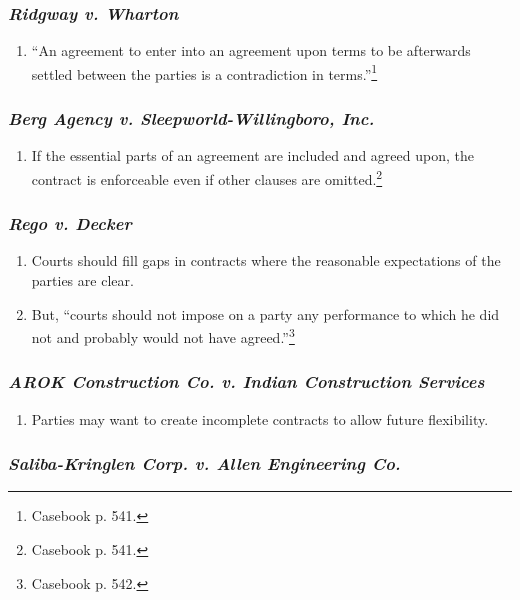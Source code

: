 \subsubsection{\emph{Ridgway v. Wharton}}

\begin{enumerate}
    \item ``An agreement to enter into an agreement upon terms to be 
    afterwards settled between the parties is a contradiction in 
    terms.''\footnote{Casebook p. 541.}
\end{enumerate}

\subsubsection{\emph{Berg Agency v. Sleepworld-Willingboro, Inc.}}

\begin{enumerate}
    \item If the essential parts of an agreement are included and agreed upon, 
    the contract is enforceable even if other clauses are 
    omitted.\footnote{Casebook p. 541.}
\end{enumerate}

\subsubsection{\emph{Rego v. Decker}}

\begin{enumerate}
    \item Courts should fill gaps in contracts where the reasonable 
    expectations of the parties are clear.
    \item But, ``courts should not impose on a party any performance to which 
    he did not and probably would not have agreed.''\footnote{Casebook p. 542.}
\end{enumerate}

\subsubsection{\emph{AROK Construction Co. v. Indian Construction Services}}

\begin{enumerate}
    \item Parties may want to create incomplete contracts to allow future 
    flexibility.
\end{enumerate}

\subsubsection{\emph{Saliba-Kringlen Corp. v. Allen Engineering Co.}}

